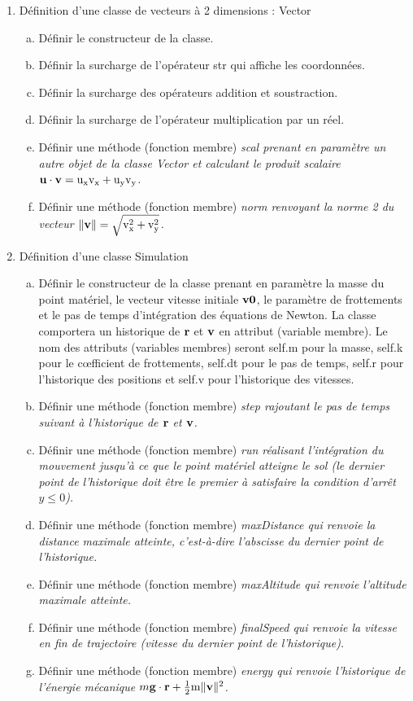 \documentclass[11pt]{article}
\begin{document}
\begin{enumerate}[1.]
  \item Définition d'une classe de vecteurs à 2 dimensions : Vector
  \begin{enumerate}[a.]
    \item Définir le constructeur de la classe. 
    \item Définir la surcharge de l'opérateur str qui affiche les coordonnées.
    \item Définir la surcharge des opérateurs addition et soustraction.
    \item Définir la surcharge de l'opérateur multiplication par un réel.
    \item Définir une méthode (fonction membre) \it{scal} \rm prenant en paramètre un autre objet de la classe Vector et calculant le produit scalaire $\bf u \rm \cdot \bf v \rm = u_xv_x + u_yv_y$.
    \item Définir une méthode (fonction membre) \it{norm} \rm renvoyant la norme 2 du vecteur $\| \bf v \rm \| = \sqrt{v_x^2 + v_y^2}$.
  \end{enumerate}
  
  \item Définition d'une classe Simulation
  \begin{enumerate}[a.]
    \item Définir le constructeur de la classe prenant en paramètre la masse du point matériel, le vecteur vitesse initiale $\bf v0$, le paramètre de frottements et le pas de temps d'intégration des équations de Newton. La classe comportera un historique de $\bf r$ et $\bf v$ en attribut (variable membre). Le nom des attributs (variables membres) seront self.m pour la masse, self.k pour le c\oe fficient de frottements, self.dt pour le pas de temps, self.r pour l'historique des positions et self.v pour l'historique des vitesses.
    \item Définir une méthode (fonction membre) \it{step} \rm rajoutant le pas de temps suivant à l'historique de $\bf r$ et $\bf v$.
    \item Définir une méthode (fonction membre) \it run \rm réalisant l'intégration du mouvement jusqu'à ce que le point matériel atteigne le sol (le dernier point de l'historique doit être le premier à satisfaire la condition d'arrêt $y \le 0$).
    \item Définir une méthode (fonction membre) \it maxDistance \rm qui renvoie la distance maximale atteinte, c'est-à-dire l'abscisse du dernier point de l'historique.
    \item Définir une méthode (fonction membre) \it maxAltitude \rm qui renvoie l'altitude maximale atteinte.
    \item Définir une méthode (fonction membre) \it finalSpeed \rm qui renvoie la vitesse en fin de trajectoire (vitesse du dernier point de l'historique).
    \item Définir une méthode (fonction membre) \it energy \rm qui renvoie l'historique de l'énergie mécanique $m \bf g \cdot r \rm + \frac{1}{2}m \| \bf v \rm \|^2$.
  \end{enumerate}
\end{enumerate}
\end{document}
